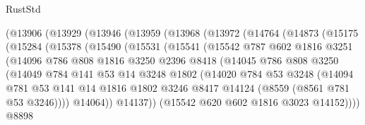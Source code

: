 \begin{lexlean}{RustStd}
\begin{coremodule}
          (@13906
            (@13929
              (@13946
                (@13959
                  (@13968
                    (@13972
                      (@14764
                        (@14873
                          (@15175
                            (@15284
                              (@15378
                                (@15490
                                  (@15531
                                    (@15541
                                      (@15542
                                        @787
                                        @602
                                        @1816
                                        @3251
                                        (@14096
                                          @786
                                          @808
                                          @1816
                                          @3250
                                          @2396
                                          @8418
                                          (@14045
                                            @786
                                            @808
                                            @3250
                                            (@14049
                                              @784
                                              @141
                                              @53
                                              @14
                                              @3248
                                              @1802
                                              (@14020
                                                @784
                                                @53
                                                @3248
                                                (@14094
                                                  @781
                                                  @53
                                                  @141
                                                  @14
                                                  @1816
                                                  @1802
                                                  @3246
                                                  @8417
                                                  @14124
                                                  (@8559 (@8561 @781 @53 @3246))))
                                              @14064))
                                          @14137))
                                      (@15542 @620 @602 @1816 @3023 @14152))))
                                @8898

\end{coremodule}
\end{lexlean}
